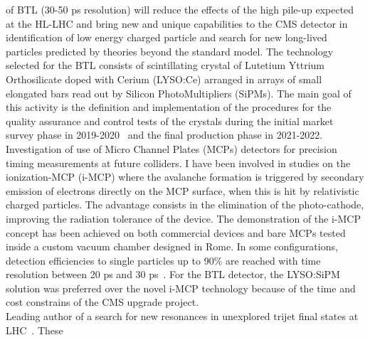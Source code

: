 \documentclass[10pt, a4paper]{article}
\newcommand{\years}[1]{\marginnote{\hskip-0.2in{\scriptsize #1}}}
\begin{document}
of BTL (30-50 ps
resolution) will reduce the effects of the high pile-up expected at
the HL-LHC and bring new and unique capabilities to the CMS detector 
in identification of low energy charged particle and search for
new long-lived particles predicted by theories beyond the standard model.
The technology selected for the BTL consists of scintillating crystal of
Lutetium Yttrium Orthosilicate doped with Cerium (LYSO:Ce) arranged in 
arrays of small elongated bars read out by Silicon PhotoMultipliers
(SiPMs). The main goal of this activity is the definition and implementation 
of the procedures for the quality assurance and control tests of the
crystals during the initial market survey phase in
2019-2020~\cite{DN-20-010} and the 
final production phase in 2021-2022.\\ [1em] 
\years{03/2014 - 09/2017} Investigation of use of Micro Channel Plates
(MCPs) detectors for precision timing measurements at future colliders. I have been
involved in studies on the ionization-MCP (i-MCP) where the
avalanche formation is triggered by secondary emission of electrons
directly on the MCP surface, when this is hit by relativistic charged
particles. The advantage consists in the elimination of the
photo-cathode, improving the radiation tolerance of the device. The
demonstration of the i-MCP concept has been achieved on both
commercial devices and bare MCPs tested inside a custom vacuum  
chamber designed in Rome. In some configurations, detection
efficiencies to single particles up to 90\% are reached with time
resolution between 20 ps and 30
ps~\cite{Brianza:2015jia,Barnyakov:2017twj,Barnyakov:2017tak,Barnyakov:2017yrj}. 
For the BTL detector, the LYSO:SiPM solution was preferred over the 
novel i-MCP technology because of the time and cost constrains 
of the CMS upgrade project. \\ [1em]
\years{09/2018 - today}Leading author of a search for new resonances in
unexplored trijet final states at LHC~\cite{AN-19-273}. These
\end{document}
